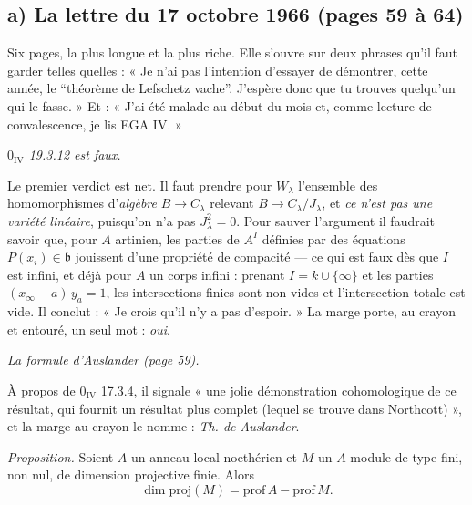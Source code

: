 \documentclass[11pt,a4paper]{article}
\begin{document}
\subsection*{a) La lettre du 17 octobre 1966 (pages 59 à 64)}

Six pages, la plus longue et la plus riche. Elle s'ouvre sur deux phrases qu'il
faut garder telles quelles : « Je n'ai pas l'intention d'essayer de démontrer,
cette année, le “théorème de Lefschetz vache”. J'espère donc que tu trouves
quelqu'un qui le fasse. » Et : « J'ai été malade au début du mois et, comme
lecture de convalescence, je lis EGA IV. »

\emph{$0_{\mathrm{IV}}$ 19.3.12 est faux.}

Le premier verdict est net. Il faut prendre pour $W_{\lambda}$ l'ensemble des
homomorphismes d'\emph{algèbre} $B \to C_{\lambda}$ relevant $B \to C_{\lambda}
/ J_{\lambda}$, et \emph{ce n'est pas une variété linéaire}, puisqu'on n'a pas
$J_{\lambda}^{2} = 0$. Pour sauver l'argument il faudrait savoir que, pour $A$
artinien, les parties de $A^{I}$ définies par des équations $P(x_{i}) \in
\mathfrak{b}$ jouissent d'une propriété de compacité — ce qui est faux dès que
$I$ est infini, et déjà pour $A$ un corps infini : prenant $I = k \cup
\{\infty\}$ et les parties $(x_{\infty} - a)\,y_{a} = 1$, les intersections
finies sont non vides et l'intersection totale est vide. Il conclut : « Je crois
qu'il n'y a pas d'espoir. » La marge porte, au crayon et entouré, un seul mot :
\emph{oui}.

\emph{La formule d'Auslander (page 59).}

À propos de $0_{\mathrm{IV}}$ 17.3.4, il signale « une jolie démonstration
cohomologique de ce résultat, qui fournit un résultat plus complet (lequel se
trouve dans Northcott) », et la marge au crayon le nomme : \emph{Th. de
Auslander}.

\emph{Proposition.} Soient $A$ un anneau local noethérien et $M$ un $A$-module
de type fini, non nul, de dimension projective finie. Alors
\[
  \dim\mathrm{proj}(M) = \mathrm{prof}\,A - \mathrm{prof}\,M .
\]
\end{document}
